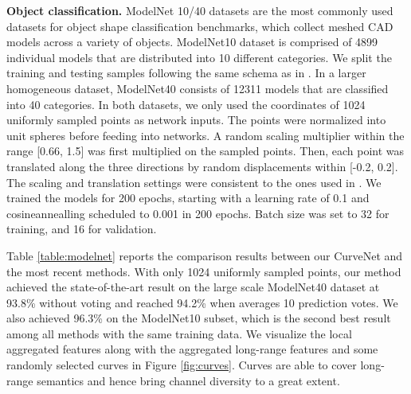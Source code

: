 \documentclass[10pt,twocolumn,letterpaper]{article}
\theoremstyle{definition}
\begin{document}
\noindent
\textbf{Object classification.} ModelNet 10/40 datasets \cite{wu20153d} are the most commonly used datasets for object shape classification benchmarks, which collect meshed CAD models across a variety of objects. ModelNet10 dataset is comprised of 4899 individual models that are distributed into 10 different categories. We split the training and testing samples following the same schema as in \cite{liu2019point2sequence}. In a larger homogeneous dataset, ModelNet40 consists of 12311 models that are classified into 40 categories. In both datasets, we only used the coordinates of 1024 uniformly sampled points as network inputs. The points were normalized into unit spheres before feeding into networks. A random scaling multiplier within the range [0.66, 1.5] was first multiplied on the sampled points. Then, each point was translated along the three directions by random displacements within [-0.2, 0.2]. The scaling and translation settings were consistent to the ones used in \cite{klokov2017escape, liu2019relation}. We trained the models for 200 epochs, starting with a learning rate of 0.1 and cosineannealling scheduled to 0.001 in 200 epochs. Batch size was set to 32 for training, and 16 for validation.

Table \ref{table:modelnet} reports the comparison results between our CurveNet and the most recent methods. With only 1024 uniformly sampled points, our method achieved the state-of-the-art result on the large scale ModelNet40 dataset at 93.8\% without voting \cite{liu2019relation} and reached 94.2\% when averages 10 prediction votes. We also achieved 96.3\% on the ModelNet10 subset, which is the second best result among all methods with the same training data. We visualize the local aggregated features along with the aggregated long-range features and some randomly selected curves in Figure \ref{fig:curves}. Curves are able to cover long-range semantics and hence bring channel diversity to a great extent. 
\end{document}
